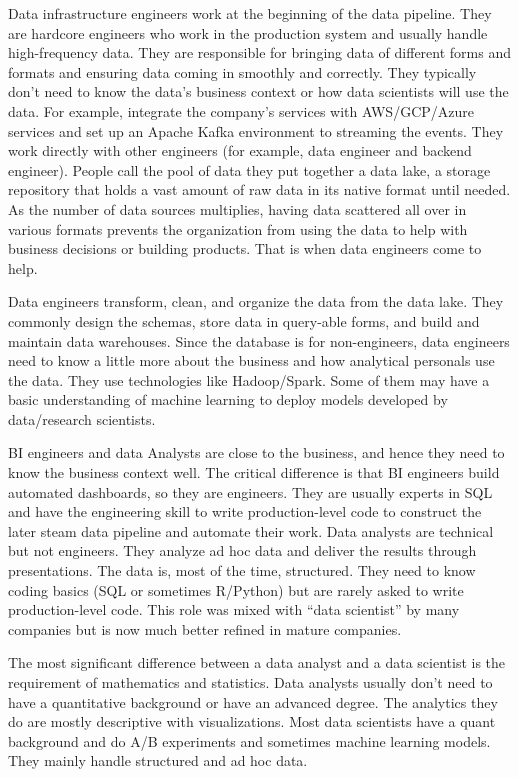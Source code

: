 \documentclass[12pt,]{krantz}
\begin{document}
Data infrastructure engineers work at the beginning of the data pipeline. They are hardcore engineers who work in the production system and usually handle high-frequency data. They are responsible for bringing data of different forms and formats and ensuring data coming in smoothly and correctly. They typically don't need to know the data's business context or how data scientists will use the data. For example, integrate the company's services with AWS/GCP/Azure services and set up an Apache Kafka environment to streaming the events. They work directly with other engineers (for example, data engineer and backend engineer). People call the pool of data they put together a data lake, a storage repository that holds a vast amount of raw data in its native format until needed. As the number of data sources multiplies, having data scattered all over in various formats prevents the organization from using the data to help with business decisions or building products. That is when data engineers come to help.

Data engineers transform, clean, and organize the data from the data lake. They commonly design the schemas, store data in query-able forms, and build and maintain data warehouses. Since the database is for non-engineers, data engineers need to know a little more about the business and how analytical personals use the data. They use technologies like Hadoop/Spark. Some of them may have a basic understanding of machine learning to deploy models developed by data/research scientists.

BI engineers and data Analysts are close to the business, and hence they need to know the business context well. The critical difference is that BI engineers build automated dashboards, so they are engineers. They are usually experts in SQL and have the engineering skill to write production-level code to construct the later steam data pipeline and automate their work. Data analysts are technical but not engineers. They analyze ad hoc data and deliver the results through presentations. The data is, most of the time, structured. They need to know coding basics (SQL or sometimes R/Python) but are rarely asked to write production-level code. This role was mixed with ``data scientist'' by many companies but is now much better refined in mature companies.

The most significant difference between a data analyst and a data scientist is the requirement of mathematics and statistics. Data analysts usually don't need to have a quantitative background or have an advanced degree. The analytics they do are mostly descriptive with visualizations. Most data scientists have a quant background and do A/B experiments and sometimes machine learning models. They mainly handle structured and ad hoc data.
\end{document}
